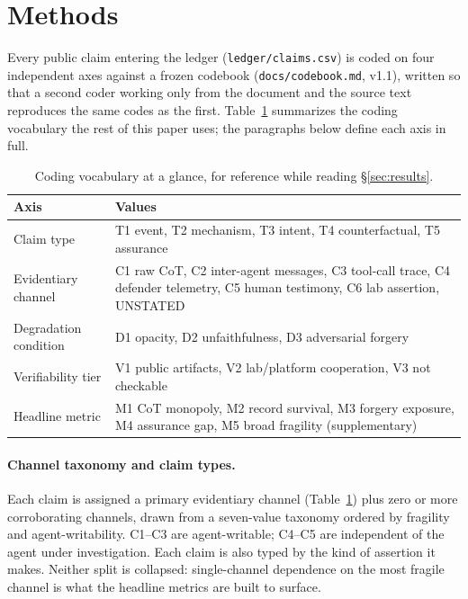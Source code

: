 \documentclass[10pt]{article}
\begin{document}
\section{Methods}
\label{sec:method}

Every public claim entering the ledger (\texttt{ledger/claims.csv}) is coded
on four independent axes against a frozen codebook (\texttt{docs/codebook.md},
v1.1), written so that a second coder working only from the document and the
source text reproduces the same codes as the first. Table~\ref{tab:glossary}
summarizes the coding vocabulary the rest of this paper uses; the paragraphs
below define each axis in full.

\begin{table}[h]
\centering
\footnotesize
\caption{Coding vocabulary at a glance, for reference while reading
\S\ref{sec:results}.}
\label{tab:glossary}
\begin{tabular}{@{}p{2.7cm}p{9.6cm}@{}}
\toprule
Axis & Values \\
\midrule
Claim type & T1 event, T2 mechanism, T3 intent, T4 counterfactual, T5 assurance \\
Evidentiary channel & C1 raw CoT, C2 inter-agent messages, C3 tool-call trace, C4 defender telemetry, C5 human testimony, C6 lab assertion, UNSTATED \\
Degradation condition & D1 opacity, D2 unfaithfulness, D3 adversarial forgery \\
Verifiability tier & V1 public artifacts, V2 lab/platform cooperation, V3 not checkable \\
Headline metric & M1 CoT monopoly, M2 record survival, M3 forgery exposure, M4 assurance gap, M5 broad fragility (supplementary) \\
\bottomrule
\end{tabular}
\end{table}

\paragraph{Channel taxonomy and claim types.} Each claim is assigned a
primary evidentiary channel (Table~\ref{tab:glossary}) plus zero or more
corroborating channels, drawn from a seven-value taxonomy ordered by
fragility and agent-writability. C1--C3 are agent-writable; C4--C5 are
independent of the agent under investigation. Each claim is also typed by
the kind of assertion it makes. Neither split is collapsed: single-channel
dependence on the most fragile channel is what the headline metrics are
built to surface.
\end{document}
